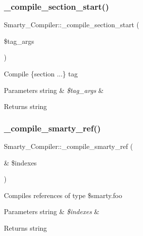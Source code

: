 \subsubsection{\texorpdfstring{\+\_\+compile\+\_\+section\+\_\+start()}{\_compile\_section\_start()}}
{\footnotesize\ttfamily Smarty\+\_\+\+Compiler\+::\+\_\+compile\+\_\+section\+\_\+start (\begin{DoxyParamCaption}\item[{}]{\$tag\+\_\+args }\end{DoxyParamCaption})}

Compile \{section ...\} tag


\begin{DoxyParams}[1]{Parameters}
string & {\em \$tag\+\_\+args} & \\
\hline
\end{DoxyParams}
\begin{DoxyReturn}{Returns}
string 
\end{DoxyReturn}
\mbox{\label{class_smarty___compiler_adc652b9fb4277fd8d33d957608394751}} 
\subsubsection{\texorpdfstring{\+\_\+compile\+\_\+smarty\+\_\+ref()}{\_compile\_smarty\_ref()}}
{\footnotesize\ttfamily Smarty\+\_\+\+Compiler\+::\+\_\+compile\+\_\+smarty\+\_\+ref (\begin{DoxyParamCaption}\item[{\&}]{\$indexes }\end{DoxyParamCaption})}

Compiles references of type \$smarty.\+foo


\begin{DoxyParams}[1]{Parameters}
string & {\em \$indexes} & \\
\hline
\end{DoxyParams}
\begin{DoxyReturn}{Returns}
string 
\end{DoxyReturn}
\mbox{\label{class_smarty___compiler_a2437ad0b38700c2b4b08573566c43c48}} 
